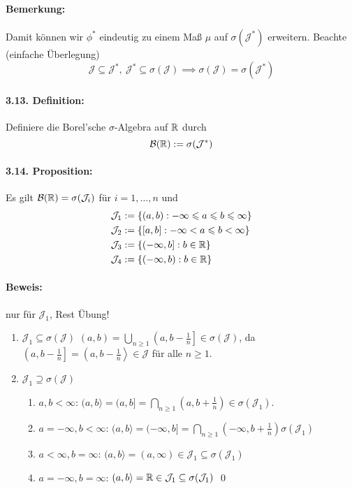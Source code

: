 \documentclass[12pt]{report}
\begin{document}
\paragraph{Bemerkung:} Damit k\"onnen wir $\phi^*$ eindeutig zu einem Ma\ss{} $\mu$ auf $\sigma(\mathcal{J}^*)$ erweitern. Beachte (einfache \"Uberlegung)
$$\mathcal{J}\subseteq\mathcal{J}^*,\ \mathcal{J}^*\subseteq\sigma(\mathcal{J})\implies\sigma(\mathcal{J})=\sigma(\mathcal{J}^*)$$

\paragraph{3.13. Definition:}Definiere die Borel'sche $\sigma$-Algebra auf $\mathbb{R}$ durch
$$\mathcal{B}(\mathbb{R}):=\sigma(\mathcal{J}^*)$$

\paragraph{3.14. Proposition:}Es gilt $\mathcal{B}(\mathbb{R})=\sigma(\mathcal{J}_i)$ f\"ur $i=1,\hdots,n$ und
\begin{align*}
    &\mathcal{J}_1:=\{(a,b):-\infty\leqslant a\leqslant b\leqslant\infty\}\\
    &\mathcal{J}_2:=\{[a,b]:-\infty< a\leqslant b<\infty\}\\
    &\mathcal{J}_3:=\{(-\infty,b]:b\in\mathbb{R}\}\\
    &\mathcal{J}_4:=\{(-\infty,b):b\in\mathbb{R}\}
\end{align*}

\paragraph{Beweis:} nur f\"ur $\mathcal{J}_1$, Rest \"Ubung!
\begin{enumerate}[label=\Roman*.]
    \item $\mathcal{J}_1\subseteq\sigma(\mathcal{J})$\newline
    $(a,b)=\bigcup_{n\geq1}\left(a,b-\frac{1}{n}\right]\in\sigma(\mathcal{J})$, da $\left(a,b-\frac{1}{n}\right]=\left(a,b-\frac{1}{n}\right\rangle\in\mathcal{J}$ f\"ur alle $n\geq1$.
    \item $\mathcal{J}_1\supseteq\sigma(\mathcal{J})$
    \begin{enumerate}[label=(\alph*)]
        \item $a,b<\infty$: $(a,b\rangle=(a,b]=\bigcap_{n\geq1}\left(a,b+\frac{1}{n}\right)\in\sigma(\mathcal{J}_1)$.
        \item $a=-\infty,b<\infty$: $(a,b\rangle=(-\infty,b]=\bigcap_{n\geq1}\left(-\infty,b+\frac{1}{n}\right)\sigma(\mathcal{J}_1)$
        \item $a<\infty,b=\infty$: $(a,b\rangle=(a,\infty)\in\mathcal{J}_1\subseteq\sigma(\mathcal{J}_1)$
        \item $a=-\infty,b=\infty$: $(a,b\rangle=\mathbb{R}\in\mathcal{J}_1\subseteq\sigma(\mathcal{J}_1)$ \qed
    \end{enumerate} 
\end{enumerate}
\end{document}
